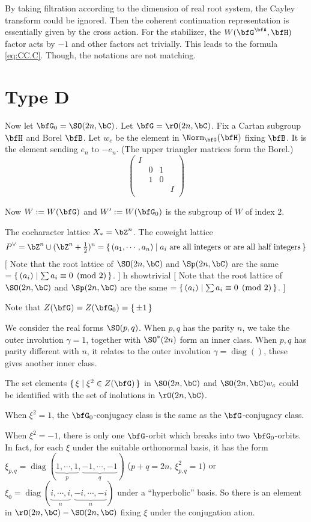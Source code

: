 \documentclass[12pt,a4paper]{amsart}
\newcommand{\trivial}[2][]{\if\relax\detokenize{#1}\relax
  {%
      \color{orange} \vspace{0em} $[$  #2 $]$
      \color{black}
  }
  \else
\ifx#1h
\ifcsname showtrivial\endcsname
{%
    \color{orange} \vspace{0em}  $[$ #2 $]$
    \color{black}
}
\fi
\else {\red Wrong argument!} \fi
\fi
}
\newcommand{\diag}{\operatorname{diag}}
\numberwithin{equation}{section}
\theoremstyle{remark}
\def\half{{\tfrac{1}{2}}}
\begin{document}
By taking filtration according to the dimension of real root system, the Cayley
transform could be ignored.  Then the coherent continuation representation is
essentially given by the cross action.  For the stabilizer, the
$W(\bfG^\bfA,\bfH)$ factor acts by $-1$ and other factors act trivially.  This
leads to the formula \eqref{eq:CC.C}. {\color{red} Though, the notations are not
  matching.}

\section{Type D}
Now let $\bfG_0=\SO(2n,\bC)$. Let $\bfG = \rO(2n,\bC)$.  Fix a Cartan subgroup
$\bfH$ and Borel $\bfB$.  Let $w_c$ be the element in $\Norm_{\bfG}(\bfH)$
fixing $\bfB$.  It is the element sending $e_n$ to $-e_n$. (The upper triangler
matrices form the Borel.)
\[
  \begin{pmatrix}
    I & & &  \\
    &0 & 1 & \\
    &1 &0  & \\
    & & & I\\
  \end{pmatrix}
\]

Now $W := W(\bfG)$ and $W' := W(\bfG_0)$ is the subgroup of $W$ of index $2$.

The cocharacter lattice $X_*=\bZ^n$.  The coweight lattice
\[ P^\vee = \bZ^n \cup (\bZ^n+\half)^n = \set{(a_1, \cdots, a_n)| a_i \text{ are
      all integers or are all half integers}}
\]
\trivial{ Note that the root lattice of $\SO(2n,\bC)$ and $\Sp(2n,\bC)$ are the
  same $=\set{(a_i)|\sum a_i \equiv 0 \pmod{2}}$.  }

Note that $Z(\bfG)=Z(\bfG_0)=\set{\pm 1}$

We consider the real forms $\SO(p,q)$.  When $p,q$ has the parity $n$, we take
the outer involution $\gamma = 1$, together with $\SO^*(2n)$ form an
inner class.  When $p,q$ has parity different with $n$, it relates to the outer involution $\gamma=\diag()$,
these gives another inner class.

The set elements $\set{\xi|\xi^2\in Z(\bfG)}$ in $\SO(2n,\bC)$ and
$\SO(2n,\bC)w_c$ could be identified with the set of inolutions in
$\rO(2n,\bC)$.

When $\xi^2 =1$, the $\bfG_0$-conjugacy class is the same as the
$\bfG$-conjugacy class.

When $\xi^2=-1$, there is only one $\bfG$-orbit which breaks into two
$\bfG_0$-orbits.  In fact, for each $\xi$ under the suitable orthonormal basis,
it has the form
$\xi_{p,q}=\diag(\underbrace{1, \cdots, 1}_p,\underbrace{-1,\cdots,-1}_q )$
($p+q=2n$, $\xi_{p,q}^2=1$) or
$\xi_0 =\diag(\underbrace{i,\cdots, i}_n,\underbrace{-i,\cdots, -i}_n)$ under a
``hyperbolic'' basis. So there is an element in $\rO(2n,\bC)-\SO(2n,\bC)$ fixing
$\xi$ under the conjugation ation.
\end{document}
